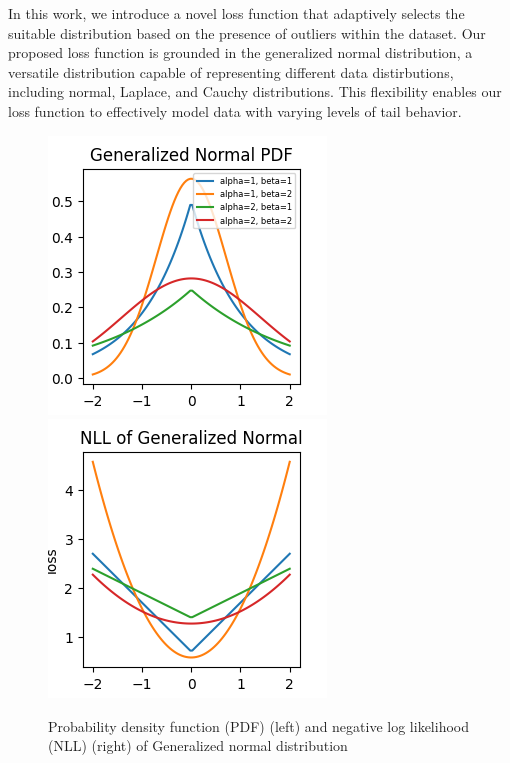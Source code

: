 \documentclass[letterpaper, 10 pt, conference]{ieeeconf}  %
\begin{document}
In this work, we introduce a novel loss function that adaptively selects the suitable distribution based on the presence of outliers within the dataset. Our proposed loss function is grounded in the generalized normal distribution, a versatile distribution capable of representing different data distirbutions, including normal, Laplace, and Cauchy distributions. This flexibility enables our loss function to effectively model data with varying levels of tail behavior.



\begin{figure}[t]
	\centering
	\includegraphics[width=0.45\linewidth]{fig/pdf.png}
 \includegraphics[width=0.45\linewidth]{fig/nll.png}
	\caption{Probability density function (PDF) (left) and negative log likelihood (NLL) (right) of Generalized normal distribution}
	\label{fig:nllgeneral}
\end{figure}
\end{document}
